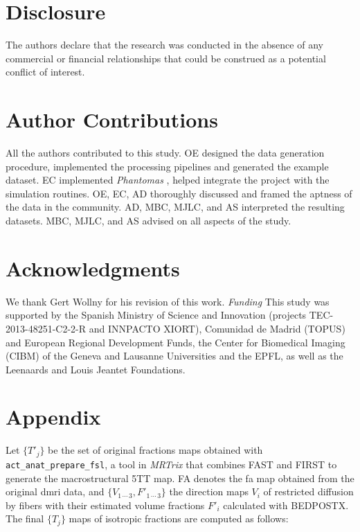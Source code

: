 \documentclass[english]{frontiers/frontiersSCNS} %
\begin{document}
\section*{Disclosure}

The authors declare that the research was conducted in the absence of any commercial or financial relationships that could be construed as a potential conflict of interest.

\section*{Author Contributions}
All the authors contributed to this study.
OE designed the data generation procedure, implemented the processing pipelines and generated the example dataset.
EC implemented \emph{Phantomas} \citep{caruyer_phantomas_2014}, helped integrate the project with the simulation routines.
OE, EC, AD thoroughly discussed and framed the aptness of the data in the community.
AD, MBC, MJLC, and AS interpreted the resulting datasets.
MBC, MJLC, and AS advised on all aspects of the study.


\section*{Acknowledgments}
We thank Gert Wollny for his revision of this work.
\textit{Funding\textcolon}
This study was supported by the Spanish Ministry of Science and Innovation
  (projects TEC-2013-48251-C2-2-R and INNPACTO XIORT), Comunidad de Madrid (TOPUS) and
  European Regional Development Funds, the Center for Biomedical Imaging
  (CIBM) of the Geneva and Lausanne Universities and the EPFL, as well as the
  Leenaards and Louis Jeantet Foundations.

\nolinenumbers




\glsresetall
\linenumbers
\section*{Appendix}\label{sec:appendix}
Let $\{T'_j\}$ be the set of original fractions maps obtained with \texttt{act\_anat\_prepare\_fsl}, a
  tool in \emph{MRTrix} that combines FAST \citep{zhang_segmentation_2001} and FIRST \citep{patenaude_bayesian_2011}
  to generate the macrostructural 5TT map.
FA denotes the \gls*{fa} map obtained from the original \gls*{dmri} data, and $\{V_{1\,\cdots\,3}, F'_{1\,\cdots\,3}\}$ the direction
  maps $V_i$ of restricted diffusion by fibers with their estimated volume fractions $F'_i$ calculated with BEDPOSTX.
The final $\{T_j\}$ maps of isotropic fractions are computed as follows:
\end{document}
